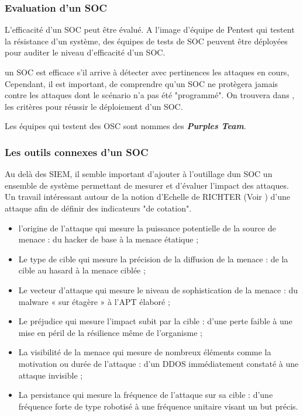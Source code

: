 \subsubsection{Evaluation d'un SOC}

L'efficacité d'un SOC peut être évalué. A l'image d'équipe de Pentest qui testent la résistance d'un système, des équipes de tests de SOC peuvent être déployées pour auditer le niveau d'efficacité d'un SOC.


un SOC est efficace s’il arrive à détecter avec pertinences les attaques en cours,  Cependant, il est important, de comprendre qu’un SOC ne protègera jamais contre les attaques dont le scénario n'a pas été "programmé". On trouvera dans , les critères pour réussir le déploiement d'un SOC.

Les équipes qui testent des OSC sont nommes des \textbf{\textit{Purples Team}}.

\subsubsection{Les outils connexes d'un SOC}

Au delà des SIEM, il semble important d'ajouter à l'outillage dun SOC un ensemble de système permettant de mesurer et d'évaluer l'impact des attaques. Un travail intéressant autour de la notion d'Echelle de RICHTER (Voir  ) d'une attaque afin de définir des indicateurs "de cotation".

\begin{itemize}
  \item l’origine de l’attaque qui mesure la puissance potentielle de la source de menace : du hacker de base à la menace étatique ;
  \item Le type de cible qui mesure la précision de la diffusion de la menace : de la cible au hasard à la menace ciblée ;
  \item Le vecteur d’attaque qui mesure le niveau de sophistication de la menace : du malware « sur étagère » à l’APT élaboré ;
   \item Le préjudice qui mesure l’impact subit par la cible : d’une perte faible à une mise en péril de la résilience même de l’organisme ;
  \item La visibilité de la menace qui mesure de nombreux éléments comme la motivation ou durée de l’attaque : d’un DDOS immédiatement constaté à une attaque invisible ;
  \item La persistance qui mesure la fréquence de l’attaque sur sa cible : d’une fréquence forte de type robotisé à une fréquence unitaire visant un but précis.
\end{itemize}


